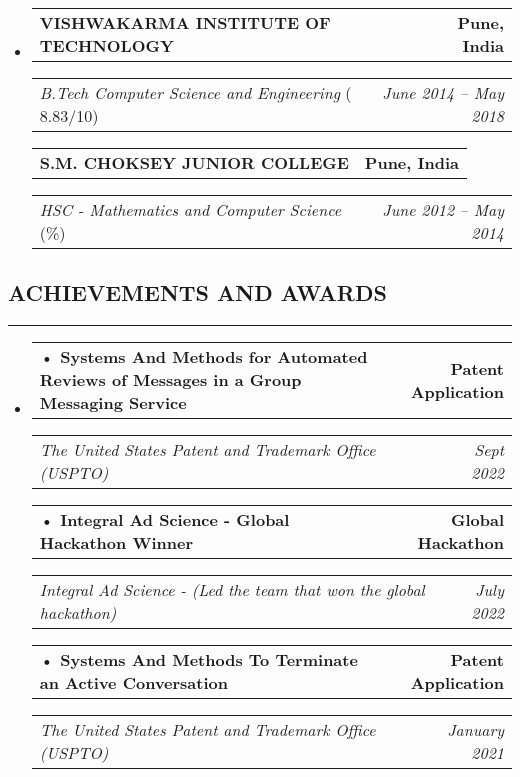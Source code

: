 \documentclass[a4paper]{article}
\makeatletter
\newcommand{\headerrow}[2]
{\begin{tabular*}{\linewidth}{l@{\extracolsep{\fill}}r}
#1 &
#2 \\
\end{tabular*}}
\makeatother
\begin{document}
\begin{itemize}[leftmargin=1em]
	\parskip=0.2em
	\item
	      \headerrow
	      {\textbf{VISHWAKARMA INSTITUTE OF TECHNOLOGY}}
	      {\textbf{Pune, India}}
	      \headerrow
	      {\emph{B.Tech Computer Science and Engineering} (\text{CPI:} 8.83/10)}
	      {\emph{June 2014 -- May 2018}}
	      \headerrow
	      {\textbf{S.M. CHOKSEY JUNIOR COLLEGE }}
	      {\textbf{Pune, India}}
	      \headerrow
	      {\emph{HSC - Mathematics and Computer Science} (\text 83.85\%)}
	      {\emph{June 2012 -- May 2014}}
	      	   
	      	      	      	      
\end{itemize}



\subsection*{\large ACHIEVEMENTS AND AWARDS}
\hrule
\vspace{1em}

\begin{itemize}[leftmargin=1em]
	\parskip=0.2em
				
	\item
	      \headerrow
	      {\textbf{• Systems And Methods for Automated Reviews of Messages in a Group Messaging Service}}
	      {\textbf{Patent Application}}
	      \headerrow
	      {\emph{The United States Patent and Trademark Office (USPTO)}}
	      {\emph{Sept 2022}}
	      	   
	      \headerrow
	      {\textbf{• Integral Ad Science - Global Hackathon Winner}}
	      {\textbf{ Global Hackathon}}
	      \headerrow
	      {\emph{Integral Ad Science - (Led the team that won the global hackathon)}}
	      {\emph{July 2022}}
	      	      
	      \headerrow
	      {\textbf{• Systems And Methods To Terminate an Active
	      Conversation}}
	      {\textbf{Patent Application}}
	      \headerrow
	      {\emph{The United States Patent and Trademark Office (USPTO)}}
	      {\emph{January 2021}}
	      
	      	      
	      	      	      	      
\end{itemize}
\end{document}
